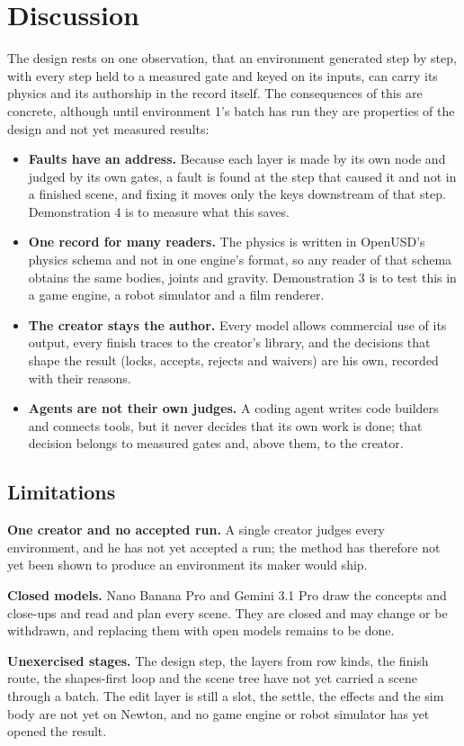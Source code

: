 \section{Discussion}\label{discussion}

The design rests on one observation, that an environment generated step by step, with every step held to a measured gate and keyed on its inputs, can carry its physics and its authorship in the record itself. The consequences of this are concrete, although until environment 1's batch has run they are properties of the design and not yet measured results:

\begin{itemize}
\tightlist
\item
  \textbf{Faults have an address.} Because each layer is made by its own node and judged by its own gates, a fault is found at the step that caused it and not in a finished scene, and fixing it moves only the keys downstream of that step. Demonstration 4 is to measure what this saves.
\item
  \textbf{One record for many readers.} The physics is written in OpenUSD's physics schema and not in one engine's format, so any reader of that schema obtains the same bodies, joints and gravity. Demonstration 3 is to test this in a game engine, a robot simulator and a film renderer.
\item
  \textbf{The creator stays the author.} Every model allows commercial use of its output, every finish traces to the creator's library, and the decisions that shape the result (locks, accepts, rejects and waivers) are his own, recorded with their reasons.
\item
  \textbf{Agents are not their own judges.} A coding agent writes code builders and connects tools, but it never decides that its own work is done; that decision belongs to measured gates and, above them, to the creator.
\end{itemize}

\subsection{Limitations}\label{limitations}

\textbf{One creator and no accepted run.} A single creator judges every environment, and he has not yet accepted a run; the method has therefore not yet been shown to produce an environment its maker would ship.

\textbf{Closed models.} Nano Banana Pro and Gemini 3.1 Pro draw the concepts and close-ups and read and plan every scene. They are closed and may change or be withdrawn, and replacing them with open models remains to be done.

\textbf{Unexercised stages.} The design step, the layers from row kinds, the finish route, the shapes-first loop and the scene tree have not yet carried a scene through a batch. The edit layer is still a slot, the settle, the effects and the sim body are not yet on Newton, and no game engine or robot simulator has yet opened the result.
